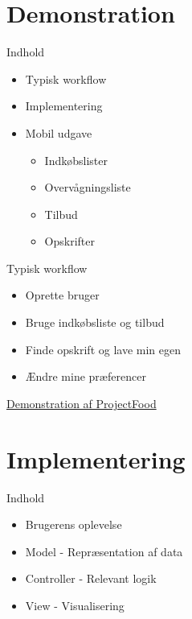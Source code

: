 \section{Demonstration}
\begin{frame}{Indhold}
    \begin{itemize}
        \item Typisk workflow
        \item Implementering
        \item Mobil udgave 
        \begin{itemize}
	    	\item Indkøbslister
	    	\item Overvågningsliste
	    	\item Tilbud
	    	\item Opskrifter
        \end{itemize}   
    \end{itemize}
\end{frame}

\begin{frame}{Typisk workflow}
	\begin{itemize}
	\item Oprette bruger
	\item Bruge indkøbsliste og tilbud
	\item Finde opskrift og lave min egen
	\item Ændre mine præferencer
	\end{itemize}
	\href{http://james:8080}{Demonstration af ProjectFood}
\end{frame}

\section{Implementering}
\begin{frame}{Indhold}
	\begin{itemize}
	\item Brugerens oplevelse
	\vspace{20pt}
	\item Model - Repræsentation af data
	\item Controller - Relevant logik
	\item View - Visualisering
	\end{itemize}	
\end{frame}

